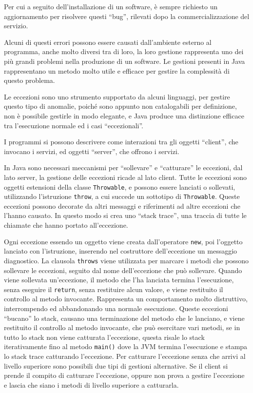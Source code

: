 \documentclass{article}
\numberwithin{equation}{subsection}
\begin{document}
Per cui a seguito dell'installazione di un software, è sempre richiesto un aggiornamento per risolvere questi ``bug'', rilevati dopo la commercializzazione del servizio. 

Alcuni di questi errori possono essere causati dall'ambiente esterno al programma, anche molto diversi tra di loro, la loro gestione rappresenta uno dei più grandi problemi 
nella produzione di un software. Le gestioni presenti in Java rappresentano un metodo molto utile e efficace per gestire la complessità di questo problema. 

Le eccezioni sono uno strumento supportato da alcuni linguaggi, per gestire questo tipo di anomalie, poiché sono appunto non catalogabili per definizione, non è possibile 
gestirle in modo elegante, e Java produce una distinzione efficace tra l'esecuzione normale ed i casi ``eccezionali''. 

I programmi si possono descrivere come interazioni tra gli oggetti ``client'', che invocano i servizi, ed oggetti ``server'', che offrono i servizi. 

In Java sono necessari meccanismi per ``sollevare'' e ``catturare'' le eccezioni, dal lato server, la gestione delle eccezioni ricade al lato client. 
Tutte le eccezioni sono oggetti estensioni della classe \verb|Throwable|, e possono essere lanciati o sollevati, utilizzando l'istruzione \verb|throw|, a cui succede un 
sottotipo di \verb|Throwable|. Queste eccezioni possono decorate da altri messaggi e riferimenti ad altre eccezioni che l'hanno causato. %
In questo modo si crea uno ``stack trace'', una traccia di tutte le chiamate che hanno portato all'eccezione. 


Ogni eccezione essendo un oggetto viene creata dall'operatore \verb|new|, poi l'oggetto lanciato con l'istruzione, inserendo nel costruttore dell'eccezione un messaggio diagnostico. 
La clausola \verb|throws| viene utilizzata per marcare i metodi che possono sollevare le eccezioni, seguito dal nome dell'eccezione che può sollevare. 
Quando viene sollevata un'eccezione, il metodo che l'ha lanciata termina l'esecuzione, senza eseguire il \verb|return|, senza restituire alcun valore, e viene restituito il 
controllo al metodo invocante. Rappresenta un comportamento molto distruttivo, interrompendo ed abbandonando una normale esecuzione. 
Queste eccezioni ``bucano'' lo stack, causano una terminazione del metodo che le lanciano, e viene restituito il controllo al metodo invocante, che può esercitare vari metodi, 
se in tutto lo stack non viene catturata l'eccezione, questa risale lo stack iterativamente fino al metodo \verb|main()| dove la JVM termina l'esecuzione e stampa lo stack trace 
catturando l'eccezione. 
Per catturare l'eccezione senza che arrivi al livello superiore sono possibili due tipi di gestioni alternative. Se il client si prende il compito di catturare l'eccezione, 
oppure non prova a gestire l'eccezione e lascia che siano i metodi di livello superiore a catturarla. 
\end{document}
